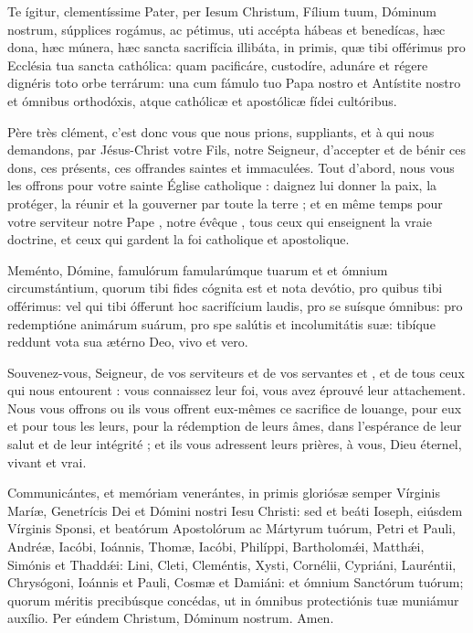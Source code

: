 \documentclass[twoside]{article}
\begin{document}
\begin{paracol}{2}

Te ígitur, clementíssime Pater, per Iesum Christum, Fílium tuum, Dóminum nostrum, súpplices rogámus, ac pétimus, uti accépta hábeas et benedícas, hæc \cc dona, hæc \cc múnera, hæc \cc sancta sacrifícia illibáta, in primis, quæ tibi offérimus pro Ecclésia tua sancta cathólica: quam pacificáre, custodíre, adunáre et régere dignéris toto orbe terrárum: una cum fámulo tuo Papa nostro et Antístite nostro et ómnibus orthodóxis, atque cathólicæ et apostólicæ fídei cultóribus.

\switchcolumn

Père très clément, c’est donc vous que nous prions, suppliants, et à qui nous demandons, par Jésus-Christ votre Fils, notre Seigneur, d’accepter et de bénir ces dons, ces présents, ces offrandes saintes et immaculées.
Tout d’abord, nous vous les offrons pour votre sainte Église catholique : daignez lui donner la paix, la protéger, la réunir et la gouverner par toute la terre ; et en même temps pour votre serviteur notre Pape , notre évêque , tous ceux qui enseignent la vraie doctrine, et ceux qui gardent la foi catholique et apostolique.

\switchcolumn*

Meménto, Dómine, famulórum famularúmque tuarum  et  et ómnium circumstántium, quorum tibi fides cógnita est et nota devótio, pro quibus tibi offérimus: vel qui tibi ófferunt hoc sacrifícium laudis, pro se suísque ómnibus: pro redemptióne animárum suárum, pro spe salútis et incolumitátis suæ: tibíque reddunt vota sua ætérno Deo, vivo et vero.

\switchcolumn

Souvenez-vous, Seigneur, de vos serviteurs et de vos servantes  et , et de tous ceux qui nous entourent : vous connaissez leur foi, vous avez éprouvé leur attachement. Nous vous offrons ou ils vous offrent eux-mêmes ce sacriﬁce de louange, pour eux et pour tous les leurs, pour la rédemption de leurs âmes, dans l’espérance de leur salut et de leur intégrité ; et ils vous adressent leurs prières, à vous, Dieu éternel, vivant et vrai.

\switchcolumn*

Communicántes, et memóriam venerántes, in primis gloriósæ semper Vírginis Maríæ, Genetrícis Dei et Dómini nostri Iesu Christi: sed et beáti Ioseph, eiúsdem Vírginis Sponsi,
et beatórum Apostolórum ac Mártyrum tuórum, Petri et Pauli, Andréæ, Iacóbi, Ioánnis, Thomæ, Iacóbi, Philíppi, Bartholomǽi, Matthǽi, Simónis et Thaddǽi: Lini, Cleti, Cleméntis, Xysti, Cornélii, Cypriáni, Lauréntii, Chrysógoni, Ioánnis et Pauli, Cosmæ et Damiáni: et ómnium Sanctórum tuórum; quorum méritis precibúsque concédas, ut in ómnibus protectiónis tuæ muniámur auxílio. Per eúndem Christum, Dóminum nostrum. Amen.


\end{paracol}
\end{document}
